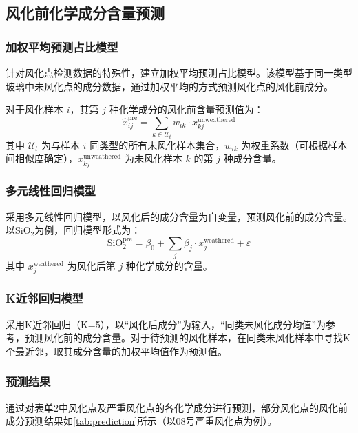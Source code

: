 \documentclass{cumcmthesis}
\begin{document}
\subsection{风化前化学成分含量预测}

\subsubsection{加权平均预测占比模型}
针对风化点检测数据的特殊性，建立加权平均预测占比模型。该模型基于同一类型玻璃中未风化点的成分数据，通过加权平均的方式预测风化点的风化前成分。

对于风化样本 $i$，其第 $j$ 种化学成分的风化前含量预测值为：
\begin{equation}
    \hat{x}_{ij}^{\text{pre}} = \sum_{k \in \mathcal{U}_t} w_{ik} \cdot x_{kj}^{\text{unweathered}}
\end{equation}
其中 $\mathcal{U}_t$ 为与样本 $i$ 同类型的所有未风化样本集合，$w_{ik}$ 为权重系数（可根据样本间相似度确定），$x_{kj}^{\text{unweathered}}$ 为未风化样本 $k$ 的第 $j$ 种成分含量。

\subsubsection{多元线性回归模型}
采用多元线性回归模型，以风化后的成分含量为自变量，预测风化前的成分含量。以SiO$_2$为例，回归模型形式为：
\begin{equation}
    \text{SiO}_2^{\text{pre}} = \beta_0 + \sum_{j} \beta_j \cdot x_j^{\text{weathered}} + \varepsilon
\end{equation}
其中 $x_j^{\text{weathered}}$ 为风化后第 $j$ 种化学成分的含量。

\subsubsection{K近邻回归模型}
采用K近邻回归（K=5），以“风化后成分”为输入，“同类未风化成分均值”为参考，预测风化前的成分含量。对于待预测的风化样本，在同类未风化样本中寻找K个最近邻，取其成分含量的加权平均值作为预测值。

\subsubsection{预测结果}

通过对表单2中风化点及严重风化点的各化学成分进行预测，部分风化点的风化前成分预测结果如\cref{tab:prediction}所示（以08号严重风化点为例）。
\end{document}
